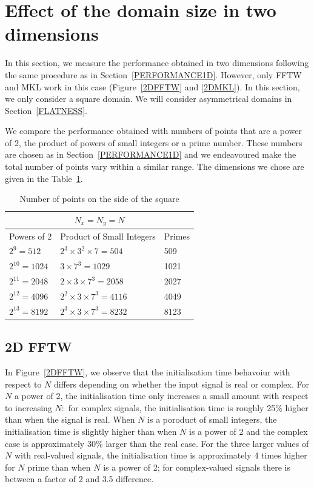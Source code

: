 \documentclass[12pt, a4paper]{article} \setlength{\textheight}{24cm}
\begin{document}
\section{Effect of the domain size in two dimensions}\label{PERFORMANCE2D}

In this section, we measure the performance obtained in two dimensions
following the same procedure as in Section~\ref{PERFORMANCE1D}.
However, only FFTW and MKL work in this case (Figure~\ref{2DFFTW} and
\ref{2DMKL}). In this section, we only consider a square domain. We
will consider asymmetrical domains in Section~\ref{FLATNESS}.

We compare the performance obtained with numbers of points that are a
power of 2, the product of powers of small integers or a prime number.
These numbers are chosen as in Section~\ref{PERFORMANCE1D} and we
endeavoured make the total number of points vary within a similar
range. The dimensions we chose are given in the Table~\ref{SIZES2D}.

\begin{table}[H]
  \centering
  \begin{tabular}{|l|l|l|}
    \hline
    \multicolumn{3}{|c|}{$N_x=N_y=N$}\\
    \hline
    \hline
    Powers of 2 & Product of Small Integers & Primes\\ \hline
    $2^9=512$ & $2^3\times 3^2\times 7=504$ & 509\\ \hline
    $2^{10}=1024$ & $3\times 7^3=1029$ & 1021\\ \hline
    $2^{11}=2048$ & $2\times 3\times 7^3=2058$ & 2027\\ \hline
    $2^{12}=4096$ & $2^2\times 3\times 7^3=4116$ & 4049\\ \hline
    $2^{13}=8192$ & $2^3\times 3\times 7^3=8232$ & 8123\\ \hline
  \end{tabular}
  \caption{Number of points on the side of the square}\label{SIZES2D}
\end{table}

\subsection{2D FFTW}
In Figure~\ref{2DFFTW}, we observe that the initialisation time
behavoiur with respect to $N$ differs depending on whether the input
signal is real or complex. For $N$ a power of 2, the initialisation
time only increases a small amount with respect to increasing $N:$ for
complex signals, the initialisation time is roughly 25\% higher than
when the signal is real. When $N$ is a poroduct of small integers, the
initialisation time is slightly higher than when $N$ is a power of 2
and the complex case is approximately 30\% larger than the real case.
For the three larger values of $N$ with real-valued signals, the
initialisation time is approximately 4 times higher for $N$ prime than
when $N$ is a power of 2; for complex-valued signals there is between
a factor of 2 and 3.5 difference.
\end{document}
